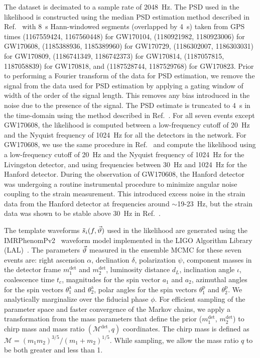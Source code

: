 The dataset is decimated to a sample rate of 2048~Hz. The PSD used in the likelihood is constructed using the median PSD estimation method described in Ref.~\cite{Allen:2005fk} with 8~s Hann-windowed segments (overlapped by 4~s) taken from GPS times (1167559424, 1167560448) for GW170104, (1180921982, 1180923006) for GW170608, (1185388936, 1185389960) for GW170729, (1186302007, 1186303031) for GW170809, (1186741349, 1186742373) for GW170814, (1187057815, 1187058839) for GW170818, and (1187528744, 1187529768) for GW170823. Prior to performing a Fourier transform of the data for PSD estimation, we remove the signal from the data used for PSD estimation by applying a gating window of width of the order of the signal length. This removes any bias introduced in the noise due to the presence of the signal. The PSD estimate is truncated to 4~s in the time-domain using the method described in Ref.~\cite{Allen:2005fk}.
For all seven events except GW170608, the likelihood is computed between a low-frequency cutoff of 20~Hz and the Nyquist frequency of 1024~Hz for all the detectors in the network. For GW170608, we use the same procedure in Ref.~\cite{Abbott:2017gyy} and compute the likelihood using a low-frequency cutoff of 20~Hz and the Nyquist frequency of 1024~Hz for the Livingston detector, and using frequencies between 30~Hz and 1024~Hz for the Hanford detector. During the observation of GW170608, the Hanford detector was undergoing a routine instrumental procedure to minimize angular noise coupling to the strain measurement. This introduced excess noise in the strain data from the Hanford detector at frequencies around $\sim$19-23~Hz, but the strain data was shown to be stable above 30~Hz in Ref.~\cite{Abbott:2017gyy}.  

The template waveforms $\tilde{s}_{i}(f, \vec{\vartheta})$ used in the likelihood are generated using the IMRPhenomPv2~\cite{Schmidt:2014iyl,Hannam:2013oca} waveform model implemented in the LIGO Algorithm Library (LAL)~\cite{lallib}. The parameters $\vec{\vartheta}$ measured in the ensemble MCMC for these seven events are: right ascension $\alpha$, declination $\delta$, polarization $\psi$, component masses in the detector frame $m_1^{\mathrm{det}}$ and $m_2^{\mathrm{det}}$, luminosity distance $d_L$, inclination angle $\iota$, coalescence time $t_c$, magnitudes for the spin vector $a_1$ and $a_2$, azimuthal angles for the spin vectors $\theta_1^\mathrm{a}$ and $\theta_2^\mathrm{a}$, polar angles for the spin vectors $\theta_1^\mathrm{p}$ and $\theta_2^\mathrm{p}$. We analytically marginalize over the fiducial phase $\phi$. For efficient sampling of the parameter space and faster convergence of the Markov chains, we apply a transformation from the mass parameters that define the prior ($m_1^{\mathrm{det}}$, $m_2^{\mathrm{det}}$) to chirp mass and mass ratio $(\mathcal{M}^{\mathrm{det}}, q)$ coordinates. The chirp mass is defined as $\mathcal{M} = (m_1 m_2)^{3/5}/(m_1 + m_2)^{1/5}$. While sampling, we allow the mass ratio $q$ to be both greater and less than 1.


